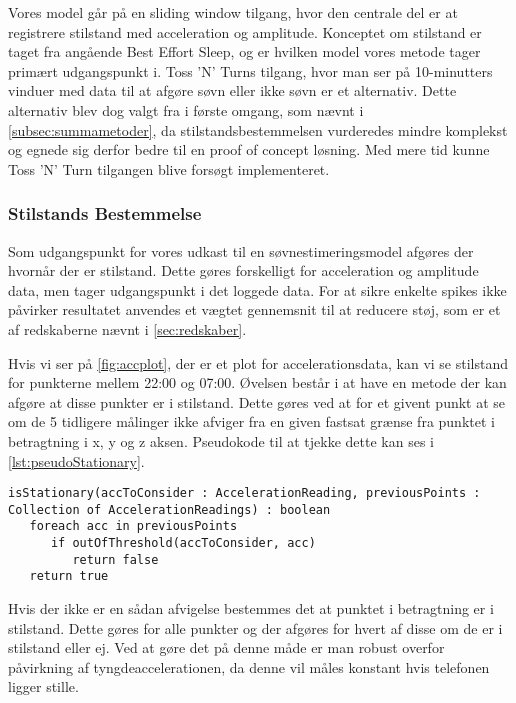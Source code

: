 Vores model går på en sliding window tilgang, hvor den centrale del er at registrere stilstand med acceleration og amplitude.
Konceptet om stilstand er taget fra \citet{6563918} angående Best Effort Sleep, og er hvilken model vores metode tager primært udgangspunkt i.
Toss 'N' Turns tilgang, hvor man ser på 10-minutters vinduer med data til at afgøre søvn eller ikke søvn er et alternativ.
Dette alternativ blev dog valgt fra i første omgang, som nævnt i \cref{subsec:summametoder}, da stilstandsbestemmelsen vurderedes mindre komplekst og egnede sig derfor bedre til en proof of concept løsning.
Med mere tid kunne Toss 'N' Turn tilgangen blive forsøgt implementeret.

\subsubsection{Stilstands Bestemmelse}
Som udgangspunkt for vores udkast til en søvnestimeringsmodel afgøres der hvornår der er stilstand.
Dette gøres forskelligt for acceleration og amplitude data, men tager udgangspunkt i det loggede data.
For at sikre enkelte spikes ikke påvirker resultatet anvendes et vægtet gennemsnit til at reducere støj, som er et af redskaberne nævnt i \cref{sec:redskaber}.

Hvis vi ser på \cref{fig:accplot}, der er et plot for accelerationsdata, kan vi se stilstand for punkterne mellem 22:00 og 07:00.
Øvelsen består i at have en metode der kan afgøre at disse punkter er i stilstand.
Dette gøres ved at for et givent punkt at se om de 5 tidligere målinger ikke afviger fra en given fastsat grænse fra punktet i betragtning i x, y og z aksen.
Pseudokode til at tjekke dette kan ses i \cref{lst:pseudoStationary}.
\begin{lstlisting}[caption={Pseudo kode for at tjekke om et punkt er i stilstand.}, label={lst:pseudoStationary}]
isStationary(accToConsider : AccelerationReading, previousPoints : Collection of AccelerationReadings) : boolean
   foreach acc in previousPoints
      if outOfThreshold(accToConsider, acc)
         return false
   return true
\end{lstlisting}

Hvis der ikke er en sådan afvigelse bestemmes det at punktet i betragtning er i stilstand.
Dette gøres for alle punkter og der afgøres for hvert af disse om de er i stilstand eller ej.
Ved at gøre det på denne måde er man robust overfor påvirkning af tyngdeaccelerationen, da denne vil måles konstant hvis telefonen ligger stille.

